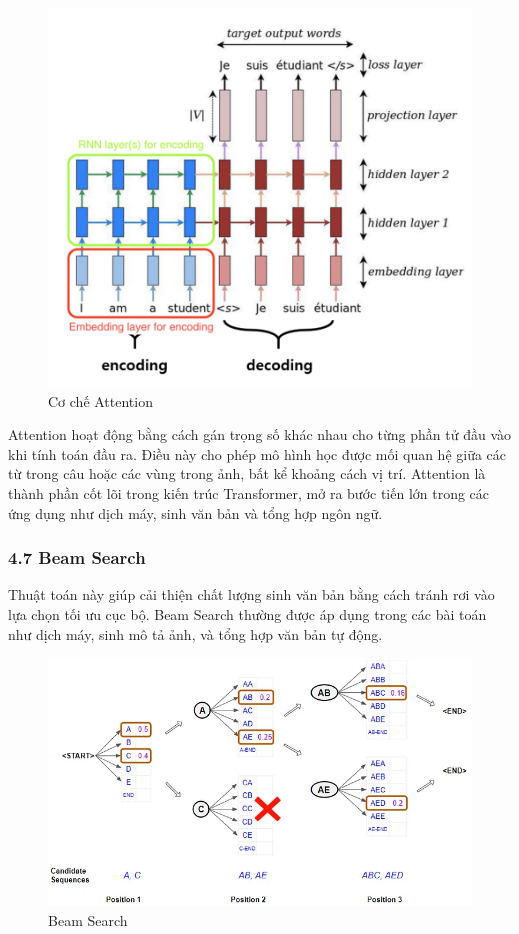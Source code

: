 \documentclass[../main.tex]{subfiles}
\begin{document}
\begin{figure}[H]
    \centering
    \includegraphics[width=1\textwidth]{Image/attention.png}
    \caption{Cơ chế Attention}
    \label{fig:Attention}
\end{figure}

Attention hoạt động bằng cách gán trọng số khác nhau cho từng phần tử đầu vào khi tính toán đầu ra. Điều này cho phép mô hình học được mối quan hệ giữa các từ trong câu hoặc các vùng trong ảnh, bất kể khoảng cách vị trí. Attention là thành phần cốt lõi trong kiến trúc Transformer, mở ra bước tiến lớn trong các ứng dụng như dịch máy, sinh văn bản và tổng hợp ngôn ngữ.

\subsubsection*{4.7 Beam Search}


Thuật toán này giúp cải thiện chất lượng sinh văn bản bằng cách tránh rơi vào lựa chọn tối ưu cục bộ. Beam Search thường được áp dụng trong các bài toán như dịch máy, sinh mô tả ảnh, và tổng hợp văn bản tự động.

\begin{figure}[H]
    \centering
    \includegraphics[width=1\textwidth]{Image/beamsearch.png}
    \caption{Beam Search}
    \label{fig:Beam Search}
\end{figure}
\end{document}
